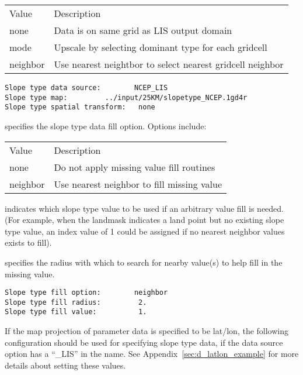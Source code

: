  \begin{tabular}{ll}
 Value    & Description                                          \\
 none     & Data is on same grid as LIS output domain            \\
 mode     & Upscale by selecting dominant type for each gridcell \\
 neighbor & Use nearest neightbor to select nearest gridcell neighbor \\
 \end{tabular}
 

 \begin{Verbatim}[frame=single]
Slope type data source:        NCEP_LIS
Slope type map:         ../input/25KM/slopetype_NCEP.1gd4r
Slope type spatial transform:   none
 \end{Verbatim}

 
  specifies the slope type 
 data fill option.  Options include:

 \begin{tabular}{ll}
 Value    & Description                                \\
 none     & Do not apply missing value fill routines   \\
 neighbor & Use nearest neighbor to fill missing value \\
 \end{tabular}

  indicates which slope type 
 value to be used if an arbitrary value fill is needed. 
 (For example, when the landmask indicates a land point but no existing 
 slope type value, an index value of 1 could be assigned if 
 no nearest neighbor values exists to fill).

  specifies the radius with which
 to search for nearby value(s) to help fill in the missing value.
 

 \begin{Verbatim}[frame=single]
Slope type fill option:        neighbor
Slope type fill radius:         2.
Slope type fill value:          1.
 \end{Verbatim}

 
 If the map projection of parameter data is specified to be lat/lon, 
 the following configuration should be used for specifying slope type
 data, if the data source option has a ``\_LIS'' in the name.
 See Appendix~\ref{sec:d_latlon_example} for more details about
 setting these values.
 

